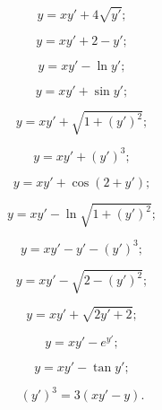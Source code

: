 \begin{enumerate}
	\begin{multicols}{2}
		\begin{problem}
			\[ y=xy'+4\sqrt{y'}; \]
		\end{problem}
		
		\begin{problem}
			\[ y=xy'+2-y'; \]
		\end{problem}
		
		\begin{problem}
			\[ y=xy'-\ln y'; \]
		\end{problem}
		
		\begin{problem}
			\[ y=xy'+\sin y'; \]
		\end{problem}
		
		\begin{problem}
			\[ y=xy'+\sqrt{1+(y')^2}; \]
		\end{problem}
		
		\begin{problem}
			\[ y=xy'+(y')^3; \]
		\end{problem}
		
		\begin{problem}
			\[ y=xy'+\cos(2+y'); \]
		\end{problem}
		
		\begin{problem}
			\[ y=xy'-\ln\sqrt{1+(y')^2}; \]
		\end{problem}
		
		\begin{problem}
			\[ y=xy'-y'-(y')^3; \]
		\end{problem}
		
		\begin{problem}
			\[ y=xy'-\sqrt{2-(y')^2}; \]
		\end{problem}
		
		\begin{problem}
			\[ y=xy'+\sqrt{2y'+2}; \]
		\end{problem}
		
		\begin{problem}
			\[ y=xy'-e^{y'}; \]
		\end{problem}
		
		\begin{problem}
			\[ y=xy'-\tan y'; \]
		\end{problem}
		
		\begin{problem}
			\[ (y')^3=3(xy'-y). \]
		\end{problem}
	\end{multicols}


\end{enumerate}
